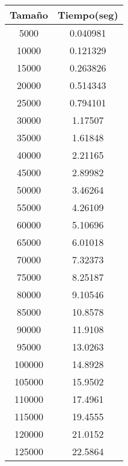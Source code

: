 \begin{longtable}{|c|c|}
\hline
\textbf{Tamaño} & \textbf{Tiempo(seg)} \\ \hline
5000   & 0.040981    \\ \hline
10000  & 0.121329    \\ \hline
15000  & 0.263826    \\ \hline
20000  & 0.514343    \\ \hline
25000  & 0.794101    \\ \hline
30000  & 1.17507     \\ \hline
35000  & 1.61848     \\ \hline
40000  & 2.21165     \\ \hline
45000  & 2.89982     \\ \hline
50000  & 3.46264     \\ \hline
55000  & 4.26109     \\ \hline
60000  & 5.10696     \\ \hline
65000  & 6.01018     \\ \hline
70000  & 7.32373     \\ \hline
75000  & 8.25187     \\ \hline
80000  & 9.10546     \\ \hline
85000  & 10.8578     \\ \hline
90000  & 11.9108     \\ \hline
95000  & 13.0263     \\ \hline
100000 & 14.8928     \\ \hline
105000 & 15.9502     \\ \hline
110000 & 17.4961     \\ \hline
115000 & 19.4555     \\ \hline
120000 & 21.0152     \\ \hline
125000 & 22.5864     \\ \hline
\end{longtable}
